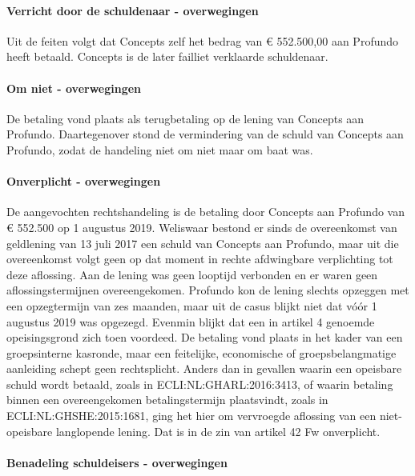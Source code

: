 \documentclass[
  dutch,
  a4paper,
]{article}
\begin{document}
\paragraph{Verricht door de schuldenaar - overwegingen}\label{verricht-door-de-schuldenaar---overwegingen-40}

Uit de feiten volgt dat Concepts zelf het bedrag van € 552.500,00 aan Profundo heeft betaald. Concepts is de later failliet verklaarde schuldenaar.

\paragraph{Om niet - overwegingen}\label{om-niet---overwegingen-40}

De betaling vond plaats als terugbetaling op de lening van Concepts aan Profundo. Daartegenover stond de vermindering van de schuld van Concepts aan Profundo, zodat de handeling niet om niet maar om baat was.

\paragraph{Onverplicht - overwegingen}\label{onverplicht---overwegingen-40}

De aangevochten rechtshandeling is de betaling door Concepts aan Profundo van € 552.500 op 1 augustus 2019. Weliswaar bestond er sinds de overeenkomst van geldlening van 13 juli 2017 een schuld van Concepts aan Profundo, maar uit die overeenkomst volgt geen op dat moment in rechte afdwingbare verplichting tot deze aflossing. Aan de lening was geen looptijd verbonden en er waren geen aflossingstermijnen overeengekomen. Profundo kon de lening slechts opzeggen met een opzegtermijn van zes maanden, maar uit de casus blijkt niet dat vóór 1 augustus 2019 was opgezegd. Evenmin blijkt dat een in artikel 4 genoemde opeisingsgrond zich toen voordeed. De betaling vond plaats in het kader van een groepsinterne kasronde, maar een feitelijke, economische of groepsbelangmatige aanleiding schept geen rechtsplicht. Anders dan in gevallen waarin een opeisbare schuld wordt betaald, zoals in ECLI:NL:GHARL:2016:3413, of waarin betaling binnen een overeengekomen betalingstermijn plaatsvindt, zoals in ECLI:NL:GHSHE:2015:1681, ging het hier om vervroegde aflossing van een niet-opeisbare langlopende lening. Dat is in de zin van artikel 42 Fw onverplicht.

\paragraph{Benadeling schuldeisers - overwegingen}\label{benadeling-schuldeisers---overwegingen-40}
\end{document}
